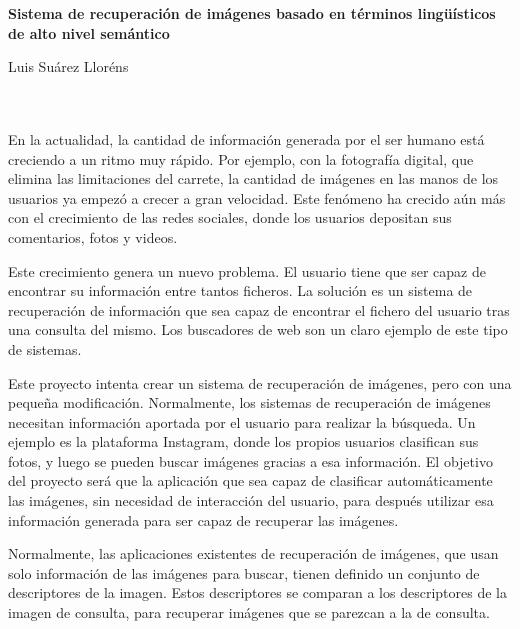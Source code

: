 
\cleardoublepage
\thispagestyle{empty}

\begin{center}
{\large\bfseries Sistema de recuperación de imágenes basado en
términos lingüísticos de alto nivel semántico}\\
\end{center}
\begin{center}
Luis Suárez Lloréns\\
\end{center}

\\

\vspace{0.7cm}
\\

En la actualidad, la cantidad de información generada por el ser humano está creciendo a un ritmo muy rápido. Por ejemplo, con la fotografía digital, que elimina las limitaciones del carrete, la cantidad de imágenes en las manos de los usuarios ya empezó a crecer a gran velocidad. Este fenómeno ha crecido aún más con el crecimiento de las redes sociales, donde los usuarios depositan sus comentarios, fotos y videos.

Este crecimiento genera un nuevo problema. El usuario tiene que ser capaz de encontrar su información entre tantos ficheros. La solución es un sistema de recuperación de información que sea capaz de encontrar el fichero del usuario tras una consulta del mismo. Los buscadores de web son un claro ejemplo de este tipo de sistemas.

Este proyecto intenta crear un sistema de recuperación de imágenes, pero con una pequeña modificación. Normalmente, los sistemas de recuperación de imágenes necesitan información aportada por el usuario para realizar la búsqueda. Un ejemplo es la plataforma Instagram, donde los propios usuarios clasifican sus fotos, y luego se pueden buscar imágenes gracias a esa información. El objetivo del proyecto será que la aplicación que sea capaz de clasificar automáticamente las imágenes, sin necesidad de interacción del usuario, para después utilizar esa información generada para ser capaz de recuperar las imágenes.

Normalmente, las aplicaciones existentes de recuperación de imágenes, que usan solo información de las imágenes para buscar, tienen definido un conjunto de descriptores de la imagen. Estos descriptores se comparan a los descriptores de la imagen de consulta, para recuperar imágenes que se parezcan a la de consulta.

